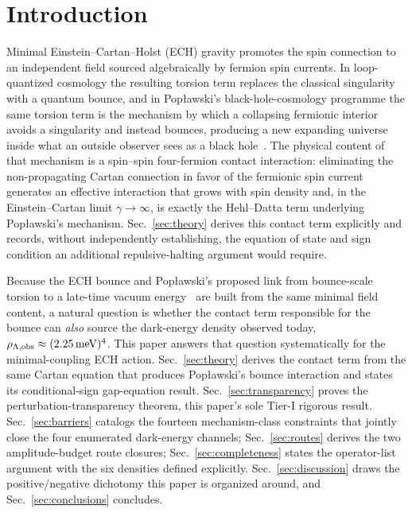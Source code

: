 \documentclass[aps,prd,twocolumn,superscriptaddress,preprintnumbers,nofootinbib,longbibliography,floatfix]{revtex4-2}
\begin{document}

\maketitle

\section{Introduction}\label{sec:intro}

Minimal Einstein--Cartan--Holst (ECH) gravity promotes the spin connection
to an independent field sourced algebraically by fermion spin currents. In
loop-quantized cosmology the resulting torsion term replaces the classical
singularity with a quantum bounce, and in Pop{\l}awski's
black-hole-cosmology programme the same torsion term is the mechanism by
which a collapsing fermionic interior avoids a singularity and instead
bounces, producing a new expanding universe inside what an outside
observer sees as a black hole~\cite{Poplawski2010,Poplawski2012,Poplawski2016,UngerPoplawski2019}.
The physical content of that mechanism is a spin--spin four-fermion
contact interaction: eliminating the non-propagating Cartan connection in
favor of the fermionic spin current generates an effective interaction
that grows with spin density and, in the Einstein--Cartan limit
$\gamma\to\infty$, is exactly the Hehl--Datta term underlying
Pop{\l}awski's mechanism. Sec.~\ref{sec:theory} derives this contact term
explicitly and records, without independently establishing, the
equation of state and sign condition an additional repulsive-halting
argument would require.

Because the ECH bounce and Pop{\l}awski's proposed link from bounce-scale
torsion to a late-time vacuum energy~\cite{Poplawski2011,Poplawski2012}
are built from the same minimal field content, a natural question is
whether the contact term responsible for the bounce can \emph{also} source
the dark-energy density observed today, $\rho_{\Lambda,\rm
obs}\approx(2.25\,\text{meV})^4$. This paper answers that question
systematically for the minimal-coupling ECH action. Sec.~\ref{sec:theory}
derives the contact term from the same Cartan equation that produces
Pop{\l}awski's bounce interaction and states its conditional-sign
gap-equation result. Sec.~\ref{sec:transparency} proves the
perturbation-transparency theorem, this paper's sole Tier-I rigorous
result. Sec.~\ref{sec:barriers} catalogs the fourteen mechanism-class
constraints that jointly close the four enumerated dark-energy channels;
Sec.~\ref{sec:routes} derives the two amplitude-budget route closures;
Sec.~\ref{sec:completeness} states the operator-list argument with the
six densities defined explicitly. Sec.~\ref{sec:discussion} draws the
positive/negative dichotomy this paper is organized around, and
Sec.~\ref{sec:conclusions} concludes.
\end{document}
